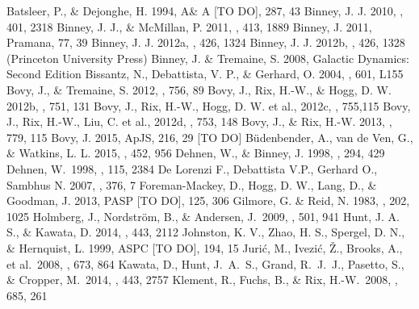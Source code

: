 \documentclass[12pt,preprint]{aastex}
\begin{document}
\begin{thebibliography}{}
 Batsleer, P., \& Dejonghe, H. 1994, A\& A [TO DO], 287, 43
 Binney, J. J. 2010, \mnras, 401, 2318
 Binney, J. J., \& McMillan, P. 2011, \mnras, 413, 1889
 Binney, J. 2011, Pramana, 77, 39
 Binney, J. J. 2012a, \mnras, 426, 1324
 Binney, J. J. 2012b, \mnras, 426, 1328 (Princeton University Press)
 Binney, J. \& Tremaine, S. 2008, Galactic Dynamics: Second Edition
 Bissantz, N., Debattista, V. P., \& Gerhard, O. 2004, \apj, 601, L155
 Bovy, J., \& Tremaine, S. 2012, \apj, 756, 89
 Bovy, J., Rix, H.-W., \& Hogg, D. W. 2012b, \apj, 751, 131
 Bovy, J., Rix, H.-W., Hogg, D. W. et al., 2012c, \apj, 755,115
 Bovy, J., Rix, H.-W., Liu, C. et al., 2012d, \apj, 753, 148
  Bovy, J., \& Rix, H.-W. 2013, \apj, 779, 115
 Bovy, J. 2015, ApJS, 216, 29 [TO DO]
 B\"{u}denbender, A., van de Ven, G., \& Watkins, L. L. 2015, \mnras, 452, 956
 Dehnen, W., \& Binney, J. 1998, \mnras, 294, 429
 Dehnen, W.\ 1998, \aj, 115, 
2384 
 De Lorenzi F., Debattista V.P., Gerhard O., Sambhus N. 2007, \mnras, 376, 7
 Foreman-Mackey, D., Hogg, D. W., Lang, D., \& Goodman, J. 2013, PASP [TO DO], 125, 306
 Gilmore, G. \& Reid, N. 1983, \mnras, 202, 1025
 Holmberg, J., Nordstr{\"o}m, B., \& Andersen, J.\ 2009, \aap, 501, 941 
 Hunt, J. A. S., \& Kawata, D. 2014, \mnras, 443, 2112
 Johnston, K. V., Zhao, H. S., Spergel, D. N., \& Hernquist, L. 1999, ASPC [TO DO], 194, 15
 Juri{\'c}, M., Ivezi{\'c}, {\v Z}., Brooks, A., et al.\ 2008, \apj, 673, 864 
 Kawata, D., Hunt, J.~A.~S., Grand, R.~J.~J., Pasetto, S., \& Cropper, M.\ 2014, \mnras, 443, 2757 
 Klement, R., Fuchs, B., \& Rix, H.-W.\ 2008, \apj, 685, 261 

\end{thebibliography}
\end{document}
